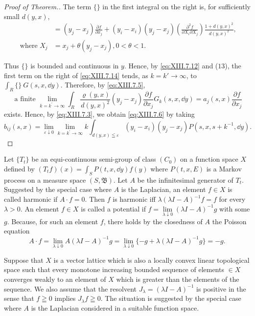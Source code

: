 \begin{proof}[Proof of Theorem.]
The term $\{\}$ in the first integral on the right is, for sufficiently small $d(y, x)$, 
\[
\begin{aligned}
&= (y _{j} - x _{j}) \frac {\partial f}{\partial x _{j}} + (y _{i} - x _{i}) (y _{j} - x _{j}) \left(\frac {\partial^{2} f}{\partial X _{i} \partial X _{j}}\right) \frac {1 + d (y , x) ^{2}}{d (y , x) ^{2}},
\\
\text{ where } X _{j} &= x _{j} + \theta (y _{j} - x _{j}), 0 < \theta < 1.
\end{aligned}
\]

Thus $\{\}$ is bounded and continuous in $y$. Hence, by \eqref{eq:XIII.7.12} and ($13$), the first term on the right of \eqref{eq:XIII.7.14} tends, as $k = k' \to \infty$, to $\int_{R} \{\}\ G(s, x, \dd y)$. Therefore, by \eqref{eq:XIII.7.5}, 
\[
\text{ a finite } \lim\limits _ {k = k ^{\prime} \rightarrow \infty} \int_{R} \frac {\varrho (y , x)}{d (y , x) ^{2}} \left(y _{j} - x _{j}\right) \frac {\partial f}{\partial x _{j}} G _{k} (s, x, \dd y) = a _{j} (s, x) \frac {\partial f}{\partial x _{j}}
\]
exists. Hence, by \eqref{eq:XIII.7.3}, we obtain \eqref{eq:XIII.7.6} by taking 
\[
b _{ij} (s, x) = \lim\limits _{\varepsilon \downarrow 0} \lim\limits _ {k = k ^{\prime} \rightarrow \infty} k \int_{d (y, x) \leqq \varepsilon} \left(y _{i} - x _{i}\right)\left(y _{j} - x _{j}\right) P (s, x, s + k ^{-1}, \dd y).
\]
\end{proof}


\label{sec:XIII.8}

Let $\{T_t\}$ be an equi-continuous semi-group of class $(C_0)$ on a function space $X$ defined by $(T_t f)(x) = \int_S P(t, x, \dd y) f(y)$ where $P(t, x, E)$ is a Markov process on a measure space $(S, \mathfrak{B})$. Let $A$ be the infinitesimal generator of $T_t$. Suggested by the special case where $A$ is the Laplacian, an element $f \in X$ is called harmonic if $A \cdot f = 0$. Then $f$ is harmonic iff $\lambda (\lambda I - A)^{-1} f = f$ for every $\lambda > 0$. An element $f \in X$ is called a potential if $f = \lim\limits_{\lambda \downarrow 0} (\lambda I - A)^{-1} g$ with some $g$. Because, for such an element $f$, there holds by the closedness of $A$ the Poisson equation 
\[
A \cdot f = \lim\limits _{\lambda \downarrow 0} A (\lambda I - A) ^{-1} g = \lim\limits _{\lambda \downarrow 0} \{- g + \lambda (\lambda I - A) ^{-1} g \} = - g.
\]

Suppose that $X$ is a vector lattice which is also a locally convex linear topological space such that every monotone increasing bounded sequence of elements $\in X$ converges weakly to an element of $X$ which is greater than the elements of the sequence. We also assume that the resolvent $J_{\lambda} = (\lambda I - A)^{-1}$ is positive in the sense that $f \geqq 0$ implies $J_{\lambda} f \geqq 0$. The situation is suggested by the special case where $A$ is the Laplacian considered in a suitable function space. 

